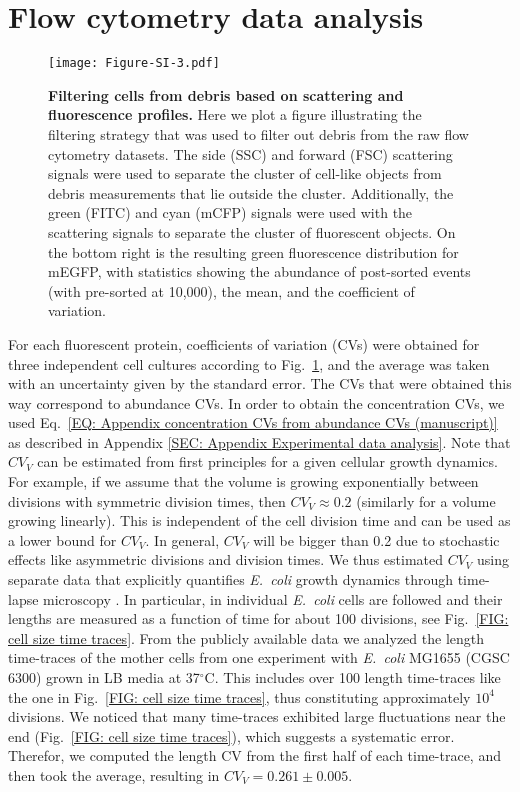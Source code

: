\documentclass[%
 reprint,
superscriptaddress,
%
%
%
%
%
%
%
%
%
 amsmath,amssymb,
 aps,
%
%
%
%
%
%
onecolumn]{revtex4-2}
\begin{document}
{\section{Flow cytometry data analysis}}


\begin{figure}[hbt!]
\texttt{[image: Figure-SI-3.pdf]}
\caption{ 
{
\textbf{Filtering cells from debris based on scattering and fluorescence profiles.} Here we plot a figure illustrating the filtering strategy that was used to filter out debris from the raw flow cytometry datasets. The side (SSC) and forward (FSC) scattering signals were used to separate the cluster of cell-like objects from debris measurements that lie outside the cluster. Additionally, the green (FITC) and cyan (mCFP) signals were used with the scattering signals to separate the cluster of fluorescent objects. On the bottom right is the resulting green fluorescence distribution for mEGFP, with statistics showing the abundance of post-sorted events (with pre-sorted at 10,000), the mean, and the coefficient of variation.}}
\label{FIG: flow software}
\end{figure} 

{
For each fluorescent protein, coefficients of variation (CVs) were obtained for three independent cell cultures according to Fig.~\ref{FIG: flow software}, and the average was taken with an uncertainty given by the standard error. The CVs that were obtained this way correspond to abundance CVs. In order to obtain the concentration CVs, we used Eq.~\eqref{EQ: Appendix concentration CVs from abundance CVs (manuscript)} as described in Appendix \ref{SEC: Appendix Experimental data analysis}. Note that $CV_{V}$ can be estimated from first principles for a given cellular growth dynamics. For example, if we assume that the volume is growing exponentially between divisions with symmetric division times, then $CV_{V} \approx 0.2$ (similarly for a volume growing linearly). This is independent of the cell division time and can be used as a lower bound for $CV_{V}$.  In general, $CV_{V}$ will be bigger than 0.2 due to stochastic effects like asymmetric divisions and division times. We thus estimated $CV_{V}$ using separate data that explicitly quantifies \emph{E.~coli} growth dynamics through time-lapse microscopy \cite{wang2010robust}. In particular, in \cite{wang2010robust} individual \emph{E.~coli} cells are followed and their lengths are measured as a function of time for about 100 divisions, see Fig.~\ref{FIG: cell size time traces}. From the publicly available data we analyzed the length time-traces of the mother cells from one experiment with \emph{E.~coli} MG1655 (CGSC 6300) grown in LB media at 37$^\circ$C. This includes over 100 length time-traces like the one in Fig.~\ref{FIG: cell size time traces}, thus constituting approximately $10^4$ divisions. We noticed that many time-traces exhibited large fluctuations near the end (Fig.~\ref{FIG: cell size time traces}), which suggests a systematic error. Therefor, we computed the length CV from the first half of each time-trace, and then took the average, resulting in $CV_{V} = 0.261\pm0.005$. }
\end{document}
